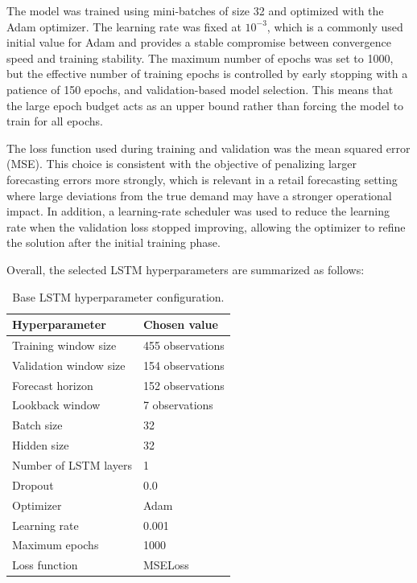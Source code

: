 The model was trained using mini-batches of size 32 and optimized with the Adam optimizer. The learning rate was fixed at \(10^{-3}\), which is a commonly used initial value for Adam and provides a stable compromise between convergence speed and training stability. The maximum number of epochs was set to 1000, but the effective number of training epochs is controlled by early stopping with a patience of 150 epochs, and validation-based model selection. This means that the large epoch budget acts as an upper bound rather than forcing the model to train for all epochs.

The loss function used during training and validation was the mean squared error (MSE). This choice is consistent with the objective of penalizing larger forecasting errors more strongly, which is relevant in a retail forecasting setting where large deviations from the true demand may have a stronger operational impact. In addition, a learning-rate scheduler was used to reduce the learning rate when the validation loss stopped improving, allowing the optimizer to refine the solution after the initial training phase.


Overall, the selected LSTM hyperparameters are summarized as follows:

\begin{table}[H]
\centering
\caption{Base LSTM hyperparameter configuration.}
\label{tab:lstm_hyperparameters}
\begin{tabular}{ll}
\hline
\textbf{Hyperparameter} & \textbf{Chosen value} \\
\hline
Training window size & 455 observations \\
Validation window size & 154 observations \\
Forecast horizon & 152 observations \\
Lookback window & 7 observations \\
Batch size & 32 \\
Hidden size & 32 \\
Number of LSTM layers & 1 \\
Dropout & 0.0 \\
Optimizer & Adam \\
Learning rate & 0.001 \\
Maximum epochs & 1000 \\
Loss function & MSELoss \\

\hline
\end{tabular}
\end{table}

